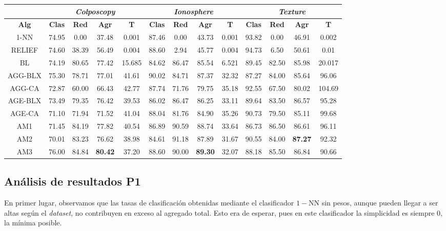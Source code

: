 \documentclass[12pt]{article}
\begin{document}
\begin{table}[h]
\begin{tabular}{ccccc|cccc|cccc}
\centering
 & \multicolumn{4}{c}{\textit{Colposcopy}} & \multicolumn{4}{c}{\textit{Ionosphere}} & \multicolumn{4}{c}{\textit{Texture}} \\ \hline
\textbf{Alg} & \textbf{Clas} & \textbf{Red} & \textbf{Agr} & \textbf{T} & \textbf{Clas} & \textbf{Red} & \textbf{Agr} & \textbf{T} & \textbf{Clas} & \textbf{Red} & \textbf{Agr} & \textbf{T} \\ \hline
1-NN & 74.95 & 0.00 & 37.48 & 0.001 & 87.46 & 0.00 & 43.73 & 0.001 & 93.82 & 0.00 & 46.91 & 0.002\\
RELIEF & 74.60 & 38.39 & 56.49 & 0.004 & 88.60 & 2.94 & 45.77 & 0.004 & 94.73 & 6.50 & 50.61 & 0.01\\
BL & 74.19 & 80.65 & 77.42 & 15.685 & 84.62 & 86.47 & 85.54 & 6.521 & 89.45 & 82.50 & 85.98 & 20.017\\
AGG-BLX & 75.30 & 78.71 & 77.01 & 41.61 & 90.02 & 84.71 & 87.37 & 32.32  & 87.27 & 84.00 & 85.64 & 96.06 \\
AGG-CA & 72.87 & 60.00 & 66.43 & 42.77 & 87.74 & 71.76 & 79.75 & 35.18 & 92.55 & 67.50 & 80.02 & 104.69 \\
AGE-BLX & 73.49 & 79.35 & 76.42 & 39.53 & 86.02 & 86.47 & 86.25 & 33.11 & 89.64 & 83.50 & 86.57 & 95.28 \\
AGE-CA & 71.10 & 71.94 & 71.52 & 41.04 & 88.04 & 81.76 & 84.90 & 35.26 & 90.73 & 79.50 & 85.11 & 99.68 \\
AM1 & 71.45 & 84.19 & {\color{blue}77.82} & 40.54 & 86.89 & 90.59 & {\color{blue}88.74} & 33.64 & 86.73 & 86.50 & 86.61 & 96.11 \\
AM2 & 70.01 & 83.23 & 76.62 & 38.98 & 84.61 & 91.18 & 87.89 & 31.67 & 90.55 & 84.00 & \textbf{87.27} & 92.32 \\
AM3 & 76.00 & 84.84 & \textbf{80.42} & 37.20 & 88.60 & 90.00 & \textbf{89.30} & 32.07 & 88.18 & 85.50 & {\color{blue}86.84} & 90.66 \\
\end{tabular}
\end{table}

\subsection*{{\color{red}Análisis de resultados P1}}

En primer lugar, observamos que las tasas de clasificación obtenidas mediante el clasificador $1-$NN sin pesos, aunque pueden llegar a ser altas según el \textit{dataset}, no contribuyen en exceso al agregado total. Esto era de esperar, pues en este clasificador la simplicidad es siempre $0$, la mínima posible.\\
\end{document}
